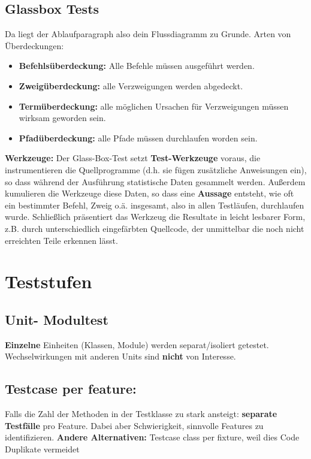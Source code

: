 \documentclass{book}
\begin{document}
    \subsection{Glassbox Tests}
    Da liegt der Ablaufparagraph also dein Flussdiagramm zu Grunde.
    Arten von Überdeckungen:
    \begin{itemize}
        \item \textbf{Befehlsüberdeckung:} Alle Befehle müssen ausgeführt werden.
        \item \textbf{Zweigüberdeckung:} alle Verzweigungen werden abgedeckt.
        \item \textbf{Termüberdeckung:} alle möglichen Ursachen für Verzweigungen müssen wirksam geworden sein.
        \item \textbf{Pfadüberdeckung:} alle Pfade müssen durchlaufen worden sein.
    \end{itemize}
    \textbf{Werkzeuge:} Der Glass-Box-Test setzt \textbf{Test-Werkzeuge} voraus, die instrumentieren die Quellprogramme (d.h. sie fügen zusätzliche
    Anweisungen ein), so dass während der Ausführung statistische Daten gesammelt werden.
    \newline
    Außerdem kumulieren die Werkzeuge diese Daten, so dass eine \textbf{Aussage} entsteht, wie oft ein bestimmter Befehl, Zweig
    o.ä. insgesamt, also in allen Testläufen, durchlaufen wurde. Schließlich präsentiert das Werkzeug die
    Resultate in leicht lesbarer Form, z.B. durch unterschiedlich eingefärbten Quellcode, der unmittelbar die noch
    nicht erreichten Teile erkennen lässt.
    \section{Teststufen}
    \subsection{Unit- Modultest}
    \textbf{Einzelne} Einheiten (Klassen, Module) werden separat/isoliert getestet. \newline Wechselwirkungen mit anderen Units sind \textbf{nicht} von Interesse.
    \subsection{Testcase per feature:}
    Falls die Zahl der Methoden in der Testklasse zu stark ansteigt: \textbf{separate Testfälle} pro Feature.
    \newline Dabei aber Schwierigkeit, sinnvolle Features zu identifizieren.
    \newline \textbf{Andere Alternativen:} Testcase class per fixture, weil dies Code Duplikate vermeidet
\end{document}
